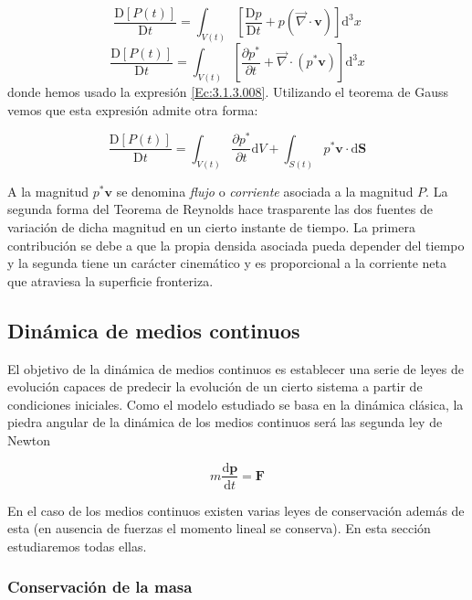 \documentclass[12pt,a4paper]{article}
\numberwithin{equation}{section}
\numberwithin{figure}{section}
\newcommand{\parciales}[2]{\frac{\partial #1}{\partial #2}}
\newcommand{\ccorchetes}[1]{\left[ #1  \right]}
\newcommand{\D}{\mathrm{d}}
\newcommand{\Dd}{\mathrm{D}}
\newcommand{\vn}{\mathbf{v}}
\newcommand{\pn}{\mathbf{p}}
\newcommand{\Fn}{\mathbf{F}}
\newcommand{\Sn}{\mathbf{S}}
\begin{document}
\begin{equation}
\dfrac{\Dd [P(t)]}{\Dd t} = \int_{V(t)} \ccorchetes{\dfrac{\Dd p}{\Dd t} + p (\vec{\nabla} \cdot \vn)} \D^3 x \label{Ec:3.5.1.030}  
\end{equation}
\begin{equation}
\dfrac{\Dd [P(t)]}{\Dd t} = \int_{V(t)} \ccorchetes{\parciales{ p^*}{ t} +  \vec{\nabla} \cdot (p^* \vn)} \D^3 x \label{Ec:3.5.1.031}  
\end{equation}
donde hemos usado la expresión \ref{Ec:3.1.3.008}. Utilizando el teorema de Gauss vemos que esta expresión admite otra forma:

\begin{equation}
\dfrac{\Dd [P (t)]}{\Dd t} = \int_{V(t)} \parciales{p^*}{t} \D V + \int_{S(t)} p^* \vn \cdot \D \Sn
\end{equation}

A la magnitud $p^* \vn$ se denomina \textit{flujo} o \textit{corriente} asociada a la magnitud $P$. La segunda forma del Teorema de Reynolds hace trasparente las dos fuentes de variación de dicha magnitud en un cierto instante de tiempo. La primera contribución se debe a que la propia densida asociada pueda depender del tiempo y la segunda tiene un carácter cinemático y es proporcional a la corriente neta que atraviesa la superficie fronteriza.

\subsection{Dinámica de medios continuos}

El objetivo de la dinámica de medios continuos es establecer una serie de leyes de evolución capaces de predecir la evolución de un cierto sistema a partir de condiciones iniciales. Como el modelo estudiado se basa en la dinámica clásica, la piedra angular de la dinámica de los medios continuos será las segunda ley de Newton

\begin{equation}
m \dfrac{\D \pn}{\D t} = \Fn
\end{equation}

En el caso de los medios continuos existen varias leyes de conservación además de esta (en ausencia de fuerzas el momento lineal se conserva). En esta sección estudiaremos todas ellas.

\subsubsection{Conservación de la masa}
\end{document}
